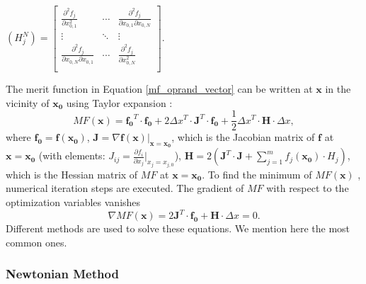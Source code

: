 \medskip
\begin{center}
$
\left( H^N_{j} \right) = 
\begin{bmatrix}
\frac{\partial^2 f_j}{\partial{x_{0,1}^2}} &    \cdots          & \frac{\partial^2 f_j}{\partial{x_{0,1}\partial{x_{0,N}}}}    \\
       \vdots                   &     \ddots            & \vdots \\
\frac{\partial^2 f_j}{\partial{x_{0,N}\partial{x_{0,1}}}}     & \cdots           & \frac{\partial^2 f_j}{\partial{x_{0,N}^2}} \\
\end{bmatrix}
$.
\end{center}
\medskip
The merit function in Equation \ref{mf_oprand_vector} can be written at $\pmb{x}$ in the vicinity of $\pmb{x_0}$ using Taylor expansion :
\begin{equation} \label{mf_expanded}
MF(\pmb{x}) = \pmb{f_{0}}^{T} \cdot \pmb{f_{0}} + 2 \Delta x^{T} \cdot \pmb{J}^{T} \cdot \pmb{f_{0}} + \frac{1}{2} \Delta x^{T} \cdot \pmb{H} \cdot \Delta x,
\end{equation}where $\pmb{f_0} = \pmb{f}(\pmb{x_0})$, $\pmb{J} = \nabla \pmb{f}(\pmb{x})\vert _{\pmb{x} = \pmb{x_0}}$, which is the Jacobian matrix of $\pmb{f}$ at $ \pmb{x} = \pmb{x_0} $ (with elements: $J_{ij} = \frac{\partial{f_i}}{\partial {x_j}} \vert _{x_j = x_{j,0}}$), $\pmb{H} = 2 \left( \pmb{J}^T \cdot \pmb{J} + \sum_{j=1}^{m} f_j(\pmb{x_0}) \cdot H_j \right) $, which is the Hessian matrix of $MF$ at $ \pmb{x} = \pmb{x_0} $. 
To find the minimum of $MF(\pmb{x})$ , numerical iteration steps are executed. The gradient of $MF$ with respect to the optimization variables vanishes
\begin{equation}\label{eq: MF_grad_zero}
\nabla MF(\pmb{x}) = 2 \pmb{J}^{T} \cdot \pmb{f_0} + \pmb{H} \cdot \Delta x = 0.
\end{equation}Different methods are used to solve these equations. We mention here the most common ones. 
\newline

\subsubsection{Newtonian Method}

